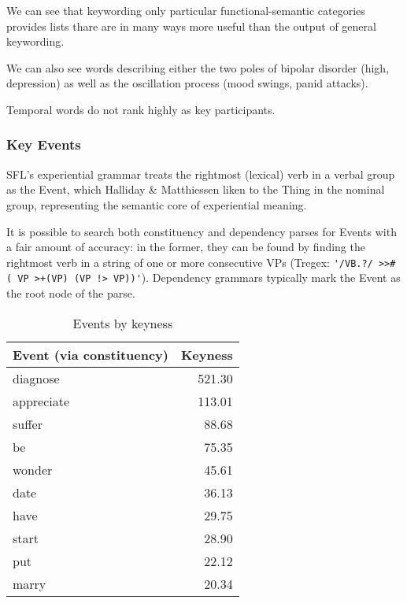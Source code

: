         We can see that keywording only particular functional-semantic categories provides lists thare are in many ways more useful than the output of general keywording.

        We can also see words describing either the two poles of bipolar disorder (high, depression) as well as the oscillation process (mood swings, panid attacks).

        Temporal words do not rank highly as key participants.

    \subsubsection{Key Events}

    SFL's experiential grammar treats the rightmost (lexical) verb in a verbal group as the Event, which Halliday \& Matthiessen liken to the Thing in the nominal group, representing the semantic core of experiential meaning. %

    It is possible to search both constituency and dependency parses for Events with a fair amount of accuracy: in the former, they can be found by finding the rightmost verb in a string of one or more consecutive VPs (Tregex: \verb:'/VB.?/ >># ( VP >+(VP) (VP !> VP))':). Dependency grammars typically mark the Event as the root node of the parse.~


    \begin{table} \singlespacing \small \centering
    \begin{tabular}{lr}
        \toprule   %
    
        Event (via constituency) &  Keyness \\
        \midrule
        diagnose   &   521.30 \\
        appreciate &   113.01 \\
        suffer     &    88.68 \\
        be         &    75.35 \\
        wonder     &    45.61 \\
        date       &    36.13 \\
        have       &    29.75 \\
        start      &    28.90 \\
        put        &    22.12 \\
        marry      &    20.34 \\
        \bottomrule
        \end{tabular}
        \caption{Events by keyness}
        \label{tab:events}
    \end{table}

